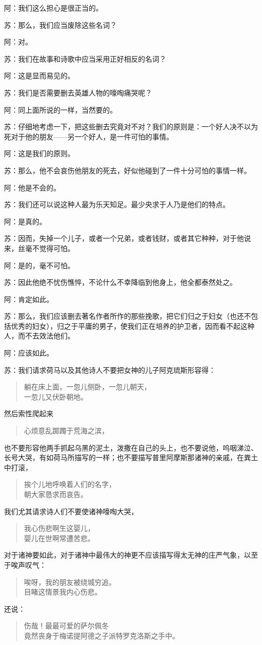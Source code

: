 \documentclass[11pt,oneside]{book}
\begin{document}
\begin{common-format}
阿：我们这么担心是很正当的。

苏：那么，我们应当废除这些名词？

阿：对。

苏：我们在故事和诗歌中应当采用正好相反的名词？

阿：这是显而易见的。

苏：我们是否需要删去英雄人物的嚎啕痛哭呢？

阿：同上面所说的一样，当然要的。

苏：仔细地考虑一下，把这些删去究竟对不对？我们的原则是：一个好人决不以为死对于他的朋友——另一个好人，是一件可怕的事情。

阿：这是我们的原则。

苏：那么，他不会哀伤他朋友的死去，好似他碰到了一件十分可怕的事情一样。

阿：他是不会的。

苏：我们还可以说这种人最为乐天知足。最少央求于人乃是他们的特点。

阿：是真的。

苏：因而，失掉一个儿子，或者一个兄弟，或者钱财，或者其它种种，对于他说来，丝毫不觉得可怕。

阿：是的，毫不可怕。

苏：因此他绝不忧伤憔悴，不论什么不幸降临到他身上，他全都泰然处之。

阿：肯定如此。

苏：那么，我们应该删去著名作者所作的那些挽歌，把它们归之于妇女（也还不包括优秀的妇女），归之于平庸的男子，使我们正在培养的护卫者，因而看不起这种人，而不去效法他们。

阿：应该如此。

苏：我们请求荷马以及其他诗人不要把女神的儿子阿克琉斯形容得：
\begin{verse}
躺在床上面，一忽儿侧卧，一忽儿朝天，\\
一忽儿又伏卧朝地。
\end{verse}
然后索性爬起来
\begin{verse}
心烦意乱踯躅于荒海之滨，
\end{verse}
也不要形容他两手抓起乌黑的泥土，泼撒在自己的头上，也不要说他，呜咽涕泣、长号大哭，有如荷马所描写的一样；也不要描写普里阿摩斯那诸神的亲戚，在粪土中打滚，
\begin{verse}
挨个儿地呼唤着人们的名字，\\
朝大家恳求而哀告。
\end{verse}
我们尤其请求诗人们不要使诸神嚎啕大哭，
\begin{verse}
我心伤悲啊生这婴儿，\\
婴儿在世啊常遭苦悲。
\end{verse}
对于诸神要如此，对于诸神中最伟大的神更不应该描写得太无神的庄严气象，以至于唉声叹气：
\begin{verse}
唉呀，我的朋友被绕城穷追。\\
目睹这情景我内心伤悲。
\end{verse}
还说：
\begin{verse}
伤哉！最最可爱的萨尔佩冬\\
竟然丧身于梅诺提阿德之子派特罗克洛斯之手中。
\end{verse}


\end{common-format}
\end{document}
